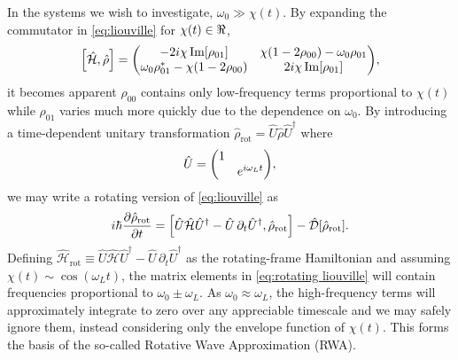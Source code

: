 \documentclass[conference]{IEEEtran}
\begin{document}
In the systems we wish to investigate, $\omega_0 \gg \chi(t)$. By expanding the commutator in \cref{eq:liouville} for $\chi(t) \in \real$,
\begin{equation}
  \commutator{\hat{\mathcal{H}}}{\hat{\rho}} =
  \mqty(
    -2 i \chi \Im[\rho_{01}] & \chi\qty(1 - 2 \rho_{00}) - \omega_0 \rho_{01} \\ 
    \omega_0 \rho_{01}^* - \chi\qty(1 - 2\rho_{00}) & 2 i \chi \Im[\rho_{01}]
  ),
\end{equation}
it becomes apparent $\rho_{00}$ contains only low-frequency terms proportional to $\chi(t)$ while $\rho_{01}$ varies much more quickly due to the dependence on $\omega_0$.
By introducing a time-dependent unitary transformation $\hat{\rho}_\text{rot} = \hat{U}\hat{\rho}\hat{U}^\dagger$ where
\begin{equation}
  \hat{U} = \mqty(\dmat{1, e^{i \omega_L t}}), 
  \label{eq:unitary transformation}
\end{equation}
we may write a rotating version of \cref{eq:liouville} as
\begin{equation}
  i \hbar \pdv{\hat{\rho}_\text{rot}}{t} = \commutator{\hat{U} \hat{\mathcal{H}} \hat{U}^\dagger - \hat{U} \, \partial_t \hat{U}^\dagger}{\hat{\rho}_\text{rot}} - \hat{\mathcal{D}}[\hat{\rho}_\text{rot}].
  \label{eq:rotating liouville}
\end{equation}
Defining $\hat{\mathcal{H}}_\text{rot} \equiv \hat{U} \hat{\mathcal{H}} \hat{U}^\dagger - \hat{U} \, \partial_t \hat{U}^\dagger$ as the rotating-frame Hamiltonian and assuming $\chi(t) \sim \cos(\omega_L t)$, the matrix elements in \cref{eq:rotating liouville} will contain frequencies proportional to $\omega_0 \pm \omega_L$.
As $\omega_0 \approx \omega_L$, the high-frequency terms will approximately integrate to zero over any appreciable timescale and we may safely ignore them, instead considering only the envelope function of $\chi(t)$. This forms the basis of the so-called Rotative Wave Approximation (RWA)\cite{Allen1987}.
\end{document}
